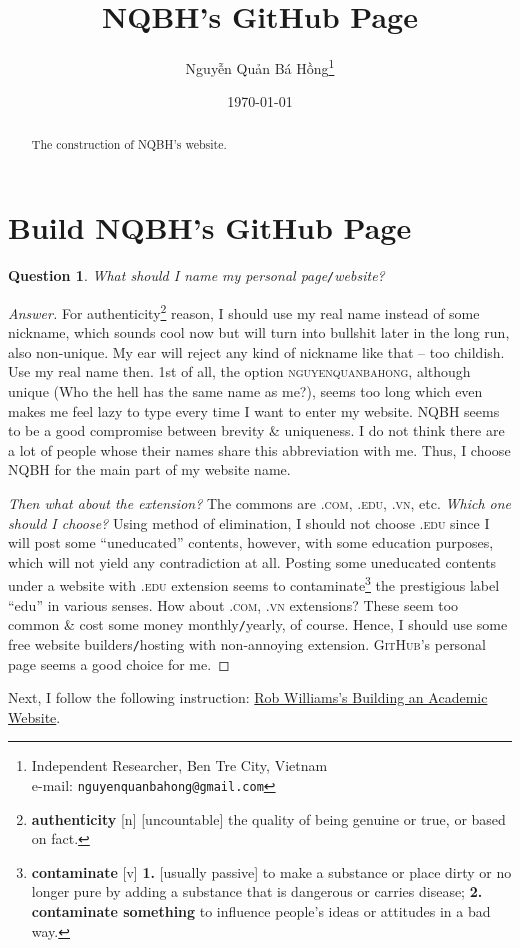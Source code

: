 \documentclass{article}
\title{NQBH's GitHub Page}
\author{\selectlanguage{vietnamese} Nguyễn Quản Bá Hồng\footnote{Independent Researcher, Ben Tre City, Vietnam\\e-mail: \texttt{nguyenquanbahong@gmail.com}}}
\date{\today}
\numberwithin{equation}{section}
\newtheorem{question}{Question}[section]
\begin{document}
\maketitle
{}
\begin{abstract}
	The construction of NQBH's website.
\end{abstract}

\tableofcontents
{}


\section{Build NQBH's GitHub Page}

\begin{question}
	What should I name my personal page\emph{\texttt{/}}website?
\end{question}

\begin{proof}[Answer]
	For authenticity\footnote{\textbf{authenticity} [n] [uncountable] the quality of being genuine or true, or based on fact.} reason, I should use my real name instead of some nickname, which sounds cool now but will turn into bullshit later in the long run, also non-unique. My ear will reject any kind of nickname like that -- too childish. Use my real name then. 1st of all, the option \textsc{nguyenquanbahong}, although unique (Who the hell has the same name as me?), seems too long which even makes me feel lazy to type every time I want to enter my website. \textsc{NQBH} seems to be a good compromise between brevity \& uniqueness. I do not think there are a lot of people whose their names share this abbreviation with me. Thus, I choose NQBH for the main part of my website name.
	
	\textit{Then what about the extension?} The commons are \textsc{.com, .edu, .vn}, etc. \textit{Which one should I choose?} Using method of elimination, I should not choose \textsc{.edu} since I will post some ``uneducated'' contents, however, with some education purposes, which will not yield any contradiction at all. Posting some uneducated contents under a website with \textsc{.edu} extension seems to contaminate\footnote{\textbf{contaminate} [v] \textbf{1.} [usually passive] to make a substance or place dirty or no longer pure by adding a substance that is dangerous or carries disease; \textbf{2.} \textbf{contaminate something} to influence people's ideas or attitudes in a bad way.} the prestigious label ``edu'' in various senses. How about \textsc{.com, .vn} extensions? These seem too common \& cost some money monthly\texttt{/}yearly, of course. Hence, I should use some free website builders\texttt{/}hosting with non-annoying extension. \textsc{GitHub}'s personal page seems a good choice for me.
\end{proof}
Next, I follow the following instruction: \href{https://jayrobwilliams.com/posts/2020/06/academic-website/}{Rob Williams's Building an Academic Website}.
\end{document}
